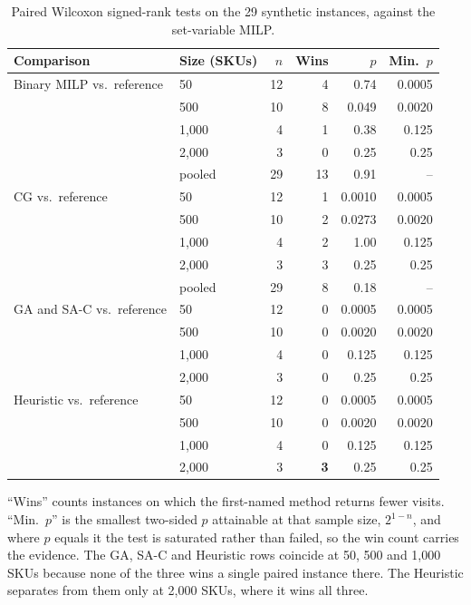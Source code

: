 \documentclass[11pt]{article}
\newcommand{\tbl}[1]{\caption{#1}}
\newcommand{\tabnote}[1]{\vspace{2pt}\footnotesize\raggedright #1\par}
\begin{document}
\begin{table}[H]
\centering
\tbl{Paired Wilcoxon signed-rank tests on the 29 synthetic instances, against the set-variable MILP.}
{\small\begin{tabular*}{\textwidth}{@{\extracolsep{\fill}}llrrrr@{}}
\toprule
Comparison & Size (SKUs) & $n$ & Wins & $p$ & Min.\ $p$ \\
\midrule
Binary MILP vs.\ reference & 50      & 12 & 4  & 0.74   & 0.0005 \\
                           & 500     & 10 & 8  & 0.049  & 0.0020 \\
                           & 1{,}000 & 4  & 1  & 0.38   & 0.125  \\
                           & 2{,}000 & 3  & 0  & 0.25   & 0.25   \\
                           & pooled  & 29 & 13 & 0.91   & --     \\
\midrule
CG vs.\ reference          & 50      & 12 & 1  & 0.0010 & 0.0005 \\
                           & 500     & 10 & 2  & 0.0273 & 0.0020 \\
                           & 1{,}000 & 4  & 2  & 1.00   & 0.125  \\
                           & 2{,}000 & 3  & 3  & 0.25   & 0.25   \\
                           & pooled  & 29 & 8  & 0.18   & --     \\
\midrule
GA and SA-C vs.\ reference & 50      & 12 & 0  & 0.0005 & 0.0005 \\
                           & 500     & 10 & 0  & 0.0020 & 0.0020 \\
                           & 1{,}000 & 4  & 0  & 0.125  & 0.125  \\
                           & 2{,}000 & 3  & 0  & 0.25   & 0.25   \\
\midrule
Heuristic vs.\ reference   & 50      & 12 & 0  & 0.0005 & 0.0005 \\
                           & 500     & 10 & 0  & 0.0020 & 0.0020 \\
                           & 1{,}000 & 4  & 0  & 0.125  & 0.125  \\
                           & 2{,}000 & 3  & \textbf{3}  & 0.25   & 0.25   \\
\bottomrule
\end{tabular*}}
\tabnote{``Wins'' counts instances on which the first-named method returns fewer visits. ``Min.\ $p$'' is the smallest two-sided $p$ attainable at that sample size, $2^{1-n}$, and where $p$ equals it the test is saturated rather than failed, so the win count carries the evidence. The GA, SA-C and Heuristic rows coincide at 50, 500 and 1{,}000 SKUs because none of the three wins a single paired instance there. The Heuristic separates from them only at 2{,}000 SKUs, where it wins all three.}
\label{tab:tests}
\end{table}
\end{document}
